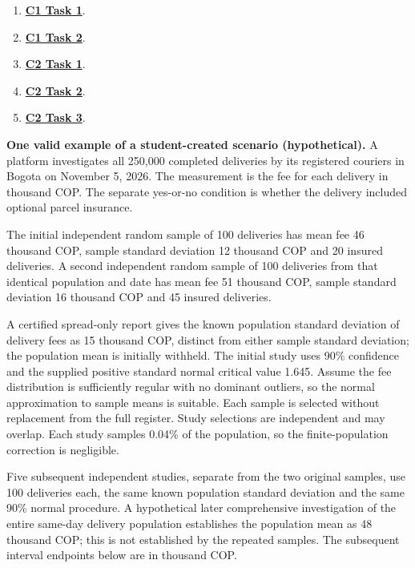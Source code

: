 \begin{enumerate}[label=(\alph*),itemsep=6pt]
\item \hyperref[sol:p3c1a]{\textbf{C1 Task 1}}. \cOneA\ 
\item \hyperref[sol:p3c1b]{\textbf{C1 Task 2}}. \cOneB\ 
\item \hyperref[sol:p3c2a]{\textbf{C2 Task 1}}. \cTwoA\ 
\item \hyperref[sol:p3c2b]{\textbf{C2 Task 2}}. \cTwoB\ 
\item \hyperref[sol:p3c2c]{\textbf{C2 Task 3}}. \cTwoC\ 
\end{enumerate}
\secInicio[][sec:p3]

\clearpage

\textbf{One valid example of a student-created scenario (hypothetical).}
A platform investigates all 250,000 completed deliveries by its registered couriers in Bogota on November 5, 2026. The measurement is the fee for each delivery in thousand COP. The separate yes-or-no condition is whether the delivery included optional parcel insurance.

The initial independent random sample of 100 deliveries has mean fee 46 thousand COP, sample standard deviation 12 thousand COP and 20 insured deliveries. A second independent random sample of 100 deliveries from that identical population and date has mean fee 51 thousand COP, sample standard deviation 16 thousand COP and 45 insured deliveries.

A certified spread-only report gives the known population standard deviation of delivery fees as 15 thousand COP, distinct from either sample standard deviation; the population mean is initially withheld. The initial study uses 90\% confidence and the supplied positive standard normal critical value 1.645. Assume the fee distribution is sufficiently regular with no dominant outliers, so the normal approximation to sample means is suitable. Each sample is selected without replacement from the full register. Study selections are independent and may overlap. Each study samples 0.04\% of the population, so the finite-population correction is negligible.

Five subsequent independent studies, separate from the two original samples, use 100 deliveries each, the same known population standard deviation and the same 90\% normal procedure. A hypothetical later comprehensive investigation of the entire same-day delivery population establishes the population mean as 48 thousand COP; this is not established by the repeated samples. The subsequent interval endpoints below are in thousand COP.

